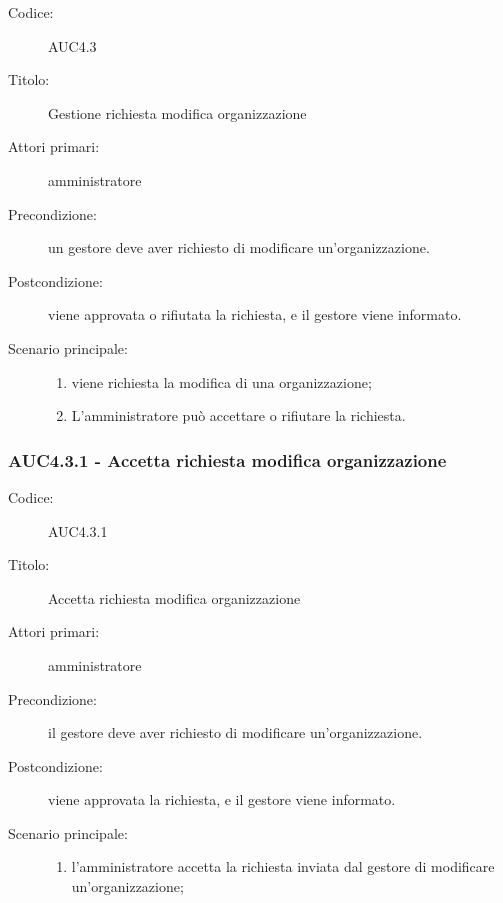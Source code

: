 \documentclass[casi-duso]{subfiles}
\begin{document}
\begin{description}
  \item[Codice:] AUC4.3
  \item[Titolo:] Gestione richiesta modifica organizzazione
  \item[Attori primari:] amministratore
  \item[Precondizione:] un gestore deve aver richiesto di modificare un'organizzazione.
  \item[Postcondizione:] viene approvata o rifiutata la richiesta, e il gestore viene informato.
  \item[Scenario principale:]
  \begin{enumerate}
    \item viene richiesta la modifica di una organizzazione;
    \item L'amministratore può accettare o rifiutare la richiesta.
  \end{enumerate}
\end{description}

\subsubsection{AUC4.3.1 - Accetta richiesta modifica organizzazione}%
\label{subsub:AUC4.3.1}
\begin{description}
  \item[Codice:] AUC4.3.1
  \item[Titolo:] Accetta richiesta modifica organizzazione
  \item[Attori primari:] amministratore
  \item[Precondizione:] il gestore deve aver richiesto di modificare un'organizzazione.
  \item[Postcondizione:] viene approvata la richiesta, e il gestore viene informato.
  \item[Scenario principale:]
  \begin{enumerate}
    \item  l'amministratore accetta la richiesta inviata dal gestore di modificare un'organizzazione;
  \end{enumerate}
\end{description}
\end{document}
